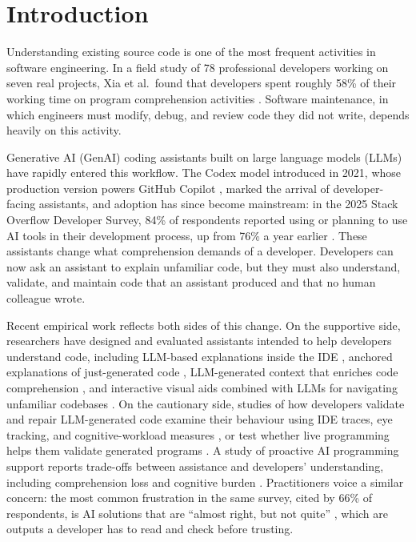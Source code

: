 \documentclass[conference]{IEEEtran}
\begin{document}
\section{Introduction}\label{sec:intro}

Understanding existing source code is one of the most frequent activities in software engineering. In a field study of 78 professional developers working on seven real projects, Xia et al.\ found that developers spent roughly 58\% of their working time on program comprehension activities \cite{xia2018}. Software maintenance, in which engineers must modify, debug, and review code they did not write, depends heavily on this activity.

Generative AI (GenAI) coding assistants built on large language models (LLMs) have rapidly entered this workflow. The Codex model introduced in 2021, whose production version powers GitHub Copilot \cite{chen2021}, marked the arrival of developer-facing assistants, and adoption has since become mainstream: in the 2025 Stack Overflow Developer Survey, 84\% of respondents reported using or planning to use AI tools in their development process, up from 76\% a year earlier \cite{so2025}. These assistants change what comprehension demands of a developer. Developers can now ask an assistant to explain unfamiliar code, but they must also understand, validate, and maintain code that an assistant produced and that no human colleague wrote.

Recent empirical work reflects both sides of this change. On the supportive side, researchers have designed and evaluated assistants intended to help developers understand code, including LLM-based explanations inside the IDE \cite{nam2024}, anchored explanations of just-generated code \cite{yan2024}, LLM-generated context that enriches code comprehension \cite{grandel2026}, and interactive visual aids combined with LLMs for navigating unfamiliar codebases \cite{kim2026}. On the cautionary side, studies of how developers validate and repair LLM-generated code examine their behaviour using IDE traces, eye tracking, and cognitive-workload measures \cite{tang2024}, or test whether live programming helps them validate generated programs \cite{ferdowsi2024}. A study of proactive AI programming support reports trade-offs between assistance and developers' understanding, including comprehension loss and cognitive burden \cite{pu2025}. Practitioners voice a similar concern: the most common frustration in the same survey, cited by 66\% of respondents, is AI solutions that are ``almost right, but not quite'' \cite{so2025}, which are outputs a developer has to read and check before trusting.
\end{document}
